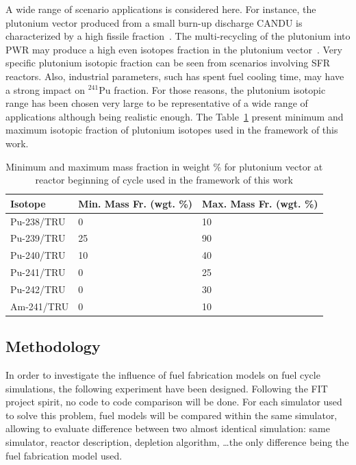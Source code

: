 A wide range of scenario applications is considered here. For instance, the plutonium vector produced from a small burn-up discharge CANDU is characterized by a high fissile fraction~\cite{Guillemin_2010}. The multi-recycling of the plutonium into PWR may produce a high even isotopes fraction in the plutonium vector~\cite{Courtin_2016}. Very specific plutonium isotopic fraction can be seen from scenarios involving SFR reactors. Also, industrial parameters, such has spent fuel cooling time, may have a strong impact on $^{241}$Pu fraction. For those reasons, the plutonium isotopic range has been chosen very large to be representative of a wide range of applications although being realistic enough. The Table~\ref{Tab:PuVector} present minimum and maximum isotopic fraction of plutonium isotopes used in the framework of this work.

\begin{table}[h]
\centering
\begin{tabular}{ |l|l|l| }
  \hline
  Isotope & Min. Mass Fr. (wgt. \%) & Max. Mass Fr. (wgt. \%) \\
  \hline
  Pu-238/TRU & 0  & 10 \\
  \hline
  Pu-239/TRU & 25 & 90 \\
  \hline
  Pu-240/TRU & 10 & 40 \\
  \hline
  Pu-241/TRU & 0  & 25 \\
  \hline
  Pu-242/TRU & 0  & 30 \\
  \hline
  Am-241/TRU & 0  & 10 \\
  \hline
\end{tabular}
\label{Tab:PuVector}
\caption{Minimum and maximum mass fraction in weight \% for plutonium vector at reactor beginning of cycle used in the framework of this work}
\end{table}

\subsection{Methodology}

In order to investigate the influence of fuel fabrication models on fuel cycle
simulations, the following experiment have been designed. Following the FIT
project spirit, no code to code comparison will be done. For each simulator used
to solve this problem, fuel models will be compared within the same simulator,
allowing to evaluate difference between two almost identical simulation: same
simulator, reactor description, depletion algorithm, \ldots the only difference
being the fuel fabrication model used.

